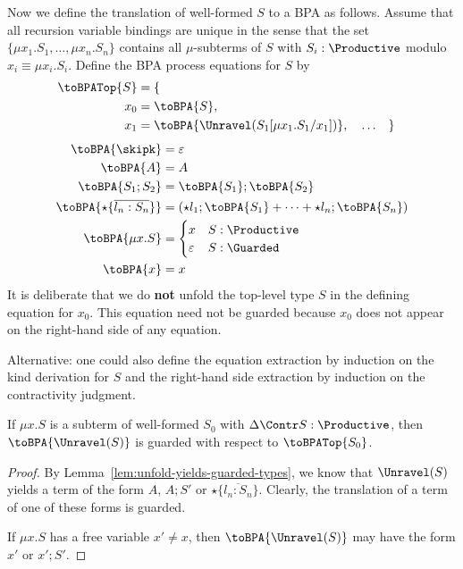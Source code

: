 Now we define the translation of well-formed $S$ to a BPA as
follows. Assume that all recursion variable bindings are unique in the
sense that the set $\{ \mu x_1.S_1, \dots, \mu x_n.S_n\}$ contains all $\mu$-subterms
of $S$ with $S_i : \Productive$ modulo $x_i \equiv \mu x_i.S_i$. 
Define the BPA process equations for $S$ by 
\begin{align*}
  \toBPATop{S} &= \{ \\
  x_0 &= \toBPA{S}, \\
               x_1&= \toBPA{\Unravel (S_1[\mu x_1.S_1/x_1])}, &
                                                                &\dots &
                                                     & \}
\end{align*}
\begin{align*}
  \toBPA{\skipk} &= \varepsilon \\
  \toBPA{A} &= A\\
  \toBPA{S_1;S_2} &= \toBPA{S_1} ; \toBPA{S_2} \\
  \toBPA{\star\{\overline{l_n:S_n}\}} &= (\star l_1;
                                        \toBPA{S_1} + \dots + \star
                                        l_n; \toBPA{S_n}) \\
  \toBPA{\mu x.S} &=
                    \begin{cases}
                      x & S : \Productive \\
                      \varepsilon & S : \Guarded
                    \end{cases}
                   \\
 \toBPA{x} &= x
\end{align*}
It is deliberate that we do \textbf{not} unfold the top-level type $S$
in the defining equation for $x_0$. This equation need not be guarded
because $x_0$ does not appear on the right-hand side of any equation.

Alternative: one could also define the equation extraction by
induction on the kind derivation for $S$ and the right-hand side
extraction by induction on the contractivity judgment. 

\begin{lemma}
  If $\mu x.S$ is a subterm of well-formed $S_0$ with $\Delta \Contr S:\Productive$, then
  $\toBPA{\Unravel (S)}$ is guarded with respect to $\toBPATop{S_0}$. 
\end{lemma}

\begin{proof}
  By Lemma~\ref{lem:unfold-yields-guarded-types}, we know that
  $\Unravel (S)$ yields a term of the form $A$, $A;S'$ or
  $\star\{\overline{l_n:S_n}\}$. Clearly, the translation of a term of
  one of these forms is guarded.

  If $\mu x.S$ has a free variable $x' \ne x$, then
  $\toBPA{\Unravel (S)}$ may have the form $x'$ or $x';S'$.
\end{proof}

